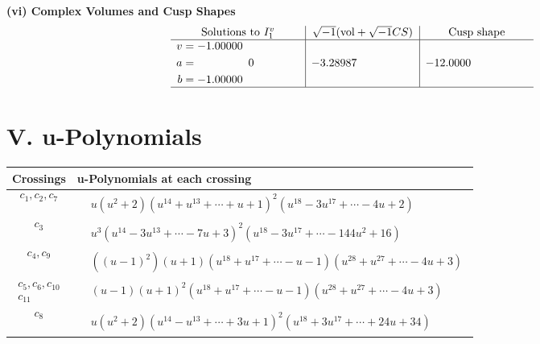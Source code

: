 \documentclass[1p]{elsarticle_modified}
\theoremstyle{definition}
\newcommand{\I}{\sqrt{-1}}
\begin{document}
\newpage\flushleft \textbf{(vi) Complex Volumes and Cusp Shapes}
$$\begin{array}{c|c|c}  
\text{Solutions to }I^v_{1}& \I (\text{vol} + \sqrt{-1}CS) & \text{Cusp shape}\\
 \hline 
\begin{aligned}
v &= -1.00000\phantom{ +0.000000I} \\
a &= \phantom{-0.000000 } 0 \\
b &= -1.00000\phantom{ +0.000000I}\end{aligned}
 & -3.28987\phantom{ +0.000000I} & -12.0000\phantom{ +0.000000I}\\
 \hline 
 \end{array}$$\newpage
\newpage\renewcommand{\arraystretch}{1}
\centering \section*{ V. u-Polynomials}
\begin{tabular}{m{50pt}|m{274pt}}
Crossings & \hspace{64pt}u-Polynomials at each crossing \\
\hline $$\begin{aligned}c_{1},c_{2},c_{7}\end{aligned}$$&$\begin{aligned}
&u(u^2+2)(u^{14}+u^{13}+\cdots+u+1)^{2}(u^{18}-3 u^{17}+\cdots-4 u+2)
\end{aligned}$\\
\hline $$\begin{aligned}c_{3}\end{aligned}$$&$\begin{aligned}
&u^3(u^{14}-3 u^{13}+\cdots-7 u+3)^{2}(u^{18}-3 u^{17}+\cdots-144 u^{2}+16)
\end{aligned}$\\
\hline $$\begin{aligned}c_{4},c_{9}\end{aligned}$$&$\begin{aligned}
&((u-1)^2)(u+1)(u^{18}+u^{17}+\cdots- u-1)(u^{28}+u^{27}+\cdots-4 u+3)
\end{aligned}$\\
\hline $$\begin{aligned}c_{5},c_{6},c_{10}\\c_{11}\end{aligned}$$&$\begin{aligned}
&(u-1)(u+1)^2(u^{18}+u^{17}+\cdots- u-1)(u^{28}+u^{27}+\cdots-4 u+3)
\end{aligned}$\\
\hline $$\begin{aligned}c_{8}\end{aligned}$$&$\begin{aligned}
&u(u^2+2)(u^{14}- u^{13}+\cdots+3 u+1)^{2}(u^{18}+3 u^{17}+\cdots+24 u+34)
\end{aligned}$\\
\hline
\end{tabular}\newpage\renewcommand{\arraystretch}{1}
\end{document}
